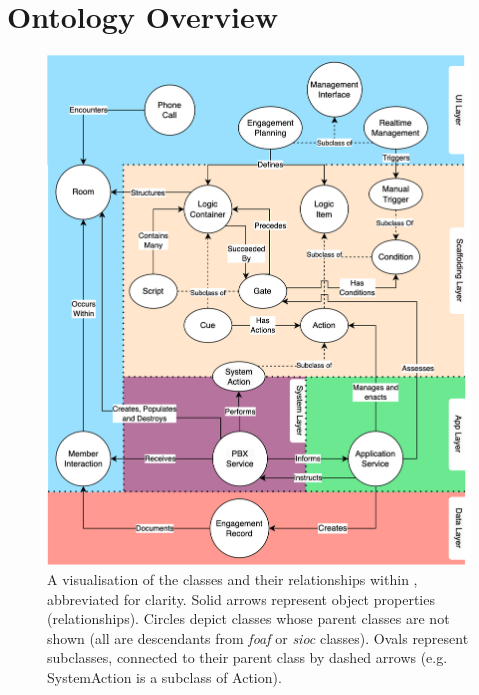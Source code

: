 \section{Ontology Overview}

\begin{figure}
  \centering
  \includegraphics[width=0.8\columnwidth]{images/simplified.drawio.png}
  \caption{A visualisation of the classes and their relationships within \ONT{}, abbreviated for clarity. Solid arrows represent object properties (relationships). Circles depict classes whose parent classes are not shown (all are descendants from \textit{foaf} or \textit{sioc} classes). Ovals represent subclasses, connected to their parent class by dashed arrows (e.g. SystemAction is a subclass of Action).}

\end{figure}
